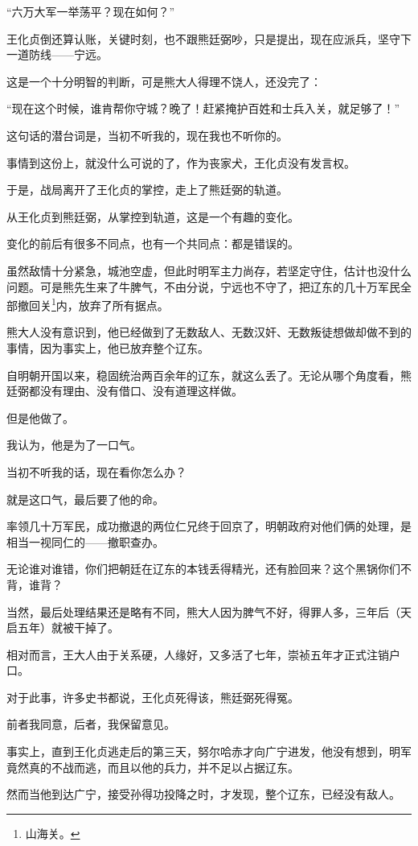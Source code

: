 \begin{multicols}{\theparacolNo}
“六万大军一举荡平？现在如何？”

王化贞倒还算认账，关键时刻，也不跟熊廷弼吵，只是提出，现在应派兵，坚守下一道防线——宁远。

这是一个十分明智的判断，可是熊大人得理不饶人，还没完了：

“现在这个时候，谁肯帮你守城？晚了！赶紧掩护百姓和士兵入关，就足够了！”

这句话的潜台词是，当初不听我的，现在我也不听你的。

事情到这份上，就没什么可说的了，作为丧家犬，王化贞没有发言权。

于是，战局离开了王化贞的掌控，走上了熊廷弼的轨道。

从王化贞到熊廷弼，从掌控到轨道，这是一个有趣的变化。

变化的前后有很多不同点，也有一个共同点：都是错误的。

虽然敌情十分紧急，城池空虚，但此时明军主力尚存，若坚定守住，估计也没什么问题。可是熊先生来了牛脾气，不由分说，宁远也不守了，把辽东的几十万军民全部撤回关\footnote{山海关。}内，放弃了所有据点。

熊大人没有意识到，他已经做到了无数敌人、无数汉奸、无数叛徒想做却做不到的事情，因为事实上，他已放弃整个辽东。

自明朝开国以来，稳固统治两百余年的辽东，就这么丢了。无论从哪个角度看，熊廷弼都没有理由、没有借口、没有道理这样做。

但是他做了。

我认为，他是为了一口气。

当初不听我的话，现在看你怎么办？

就是这口气，最后要了他的命。

率领几十万军民，成功撤退的两位仁兄终于回京了，明朝政府对他们俩的处理，是相当一视同仁的——撤职查办。

无论谁对谁错，你们把朝廷在辽东的本钱丢得精光，还有脸回来？这个黑锅你们不背，谁背？

当然，最后处理结果还是略有不同，熊大人因为脾气不好，得罪人多，三年后（天启五年）就被干掉了。

相对而言，王大人由于关系硬，人缘好，又多活了七年，崇祯五年才正式注销户口。

对于此事，许多史书都说，王化贞死得该，熊廷弼死得冤。

前者我同意，后者，我保留意见。

事实上，直到王化贞逃走后的第三天，努尔哈赤才向广宁进发，他没有想到，明军竟然真的不战而逃，而且以他的兵力，并不足以占据辽东。

然而当他到达广宁，接受孙得功投降之时，才发现，整个辽东，已经没有敌人。


\end{multicols}
